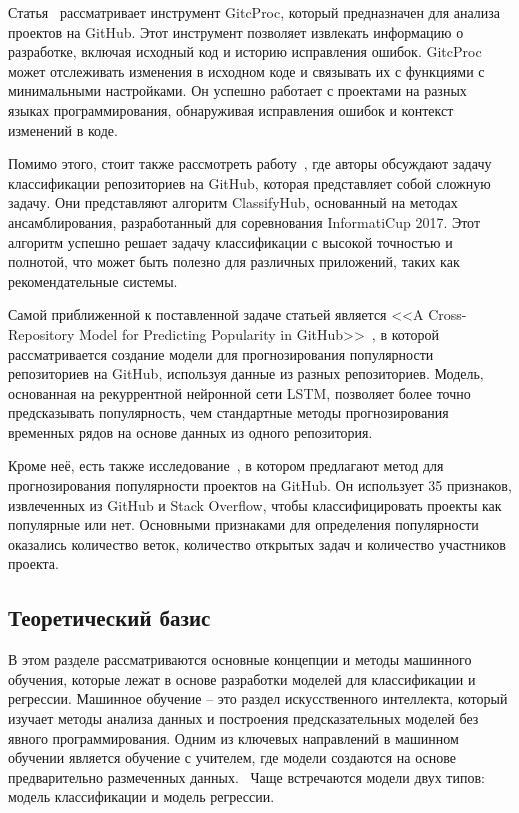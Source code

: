 Статья~\cite{CasalnuovoSRR17} рассматривает инструмент GitcProc, который предназначен для анализа проектов на GitHub. Этот инструмент позволяет извлекать информацию о разработке, включая исходный код и историю исправления ошибок. GitcProc может отслеживать изменения в исходном коде и связывать их с функциями с минимальными настройками. Он успешно работает с проектами на разных языках программирования, обнаруживая исправления ошибок и контекст изменений в коде. 

Помимо этого, стоит также рассмотреть работу~\cite{SollV17}, где авторы обсуждают задачу классификации репозиториев на GitHub, которая представляет собой сложную задачу. Они представляют алгоритм ClassifyHub, основанный на методах ансамблирования, разработанный для соревнования InformatiCup 2017. Этот алгоритм успешно решает задачу классификации с высокой точностью и полнотой, что может быть полезно для различных приложений, таких как рекомендательные системы.

Самой приближенной к поставленной задаче статьей является <<A Cross-Repository Model for Predicting Popularity in GitHub>>~\cite{abs-1902-05216}, в которой рассматривается создание модели для прогнозирования популярности репозиториев на GitHub, используя данные из разных репозиториев. Модель, основанная на рекуррентной нейронной сети LSTM, позволяет более точно предсказывать популярность, чем стандартные методы прогнозирования временных рядов на основе данных из одного репозитория. 

Кроме неё, есть также исследование~\cite{HanDXWY19}, в котором предлагают метод для прогнозирования популярности проектов на GitHub. Он использует 35 признаков, извлеченных из GitHub и Stack Overflow, чтобы классифицировать проекты как популярные или нет. Основными признаками для определения популярности оказались количество веток, количество открытых задач и количество участников проекта.

\subsection{Теоретический базис}
\label{sec:Models}

В этом разделе рассматриваются основные концепции и методы машинного обучения, которые лежат в основе разработки моделей для классификации и регрессии. Машинное обучение -- это раздел искусственного интеллекта, который изучает методы анализа данных и построения предсказательных моделей без явного программирования. Одним из ключевых направлений в машинном обучении является обучение с учителем, где модели создаются на основе предварительно размеченных данных.~\cite{books_daglib_0033642} Чаще встречаются модели двух типов: модель классификации и модель регрессии.

